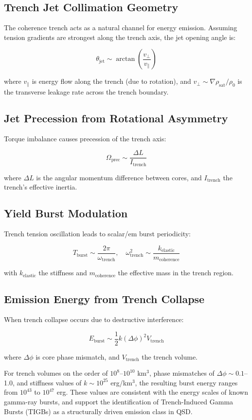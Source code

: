 \documentclass[sn-mathphys]{sn-jnl}
\theoremstyle{thmstyleone}%
\theoremstyle{thmstyletwo}%
\theoremstyle{thmstylethree}%
\begin{document}
\subsection{Trench Jet Collimation Geometry}
The coherence trench acts as a natural channel for energy emission. Assuming tension gradients are strongest along the trench axis, the jet opening angle is:

$$
\theta_{\text{jet}} \sim \arctan\left(\frac{v_\perp}{v_\parallel}\right)
$$

where $v_\parallel$ is energy flow along the trench (due to rotation), and $v_\perp \sim \nabla \rho_{\text{sat}} / \rho_0$ is the transverse leakage rate across the trench boundary.

\subsection{Jet Precession from Rotational Asymmetry}
Torque imbalance causes precession of the trench axis:

$$
\Omega_{\text{prec}} \sim \frac{\Delta L}{I_{\text{trench}}}
$$

where $\Delta L$ is the angular momentum difference between cores, and $I_{\text{trench}}$ the trench's effective inertia.

\subsection{Yield Burst Modulation}
Trench tension oscillation leads to scalar/em burst periodicity:

$$
T_{\text{burst}} \sim \frac{2\pi}{\omega_{\text{trench}}}, \quad \omega_{\text{trench}}^2 \sim \frac{k_{\text{elastic}}}{m_{\text{coherence}}}
$$

with $k_{\text{elastic}}$ the stiffness and $m_{\text{coherence}}$ the effective mass in the trench region.

\subsection{Emission Energy from Trench Collapse}
When trench collapse occurs due to destructive interference:

$$
E_{\text{burst}} \sim \frac{1}{2} k (\Delta \phi)^2 V_{\text{trench}}
$$

where $\Delta \phi$ is core phase mismatch, and $V_{\text{trench}}$ the trench volume.

For trench volumes on the order of $10^8$–$10^{10}$ km$^3$, phase mismatches of $ \Delta \phi \sim 0.1$–1.0, and stiffness values of $k \sim 10^{25}$ erg/km$^3$, the resulting burst energy ranges from $10^{43}$ to $10^{47}$ erg. These values are consistent with the energy scales of known gamma-ray bursts, and support the identification of Trench-Induced Gamma Bursts (TIGBs) as a structurally driven emission class in QSD.
\end{document}
